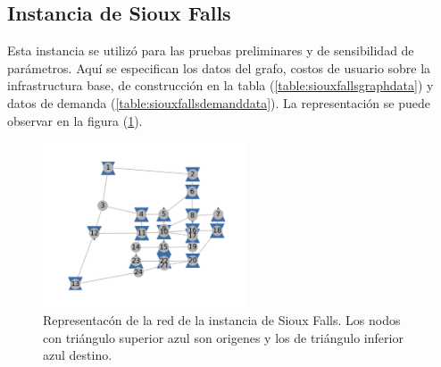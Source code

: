 \documentclass{article}
\begin{document}
  \subsection*{Instancia de Sioux Falls}

  Esta instancia se utilizó para las pruebas preliminares y de sensibilidad de parámetros. Aquí se especifican los datos del grafo, costos de usuario sobre la infrastructura base, de construcción en la tabla (\ref{table:siouxfallsgraphdata}) y datos de demanda (\ref{table:siouxfallsdemanddata}). La representación se puede observar en la figura (\ref{fig:siouxfallsapendix}).

  \begin{figure}[h!]
    \centering
    \includegraphics[width=6cm]{../resources/sioux_falls_odpairs.png}
    \caption{Representacón de la red de la instancia de Sioux Falls. Los nodos con triángulo superior azul son origenes y los de triángulo inferior azul destino.}
    \label{fig:siouxfallsapendix}
  \end{figure}
\end{document}
